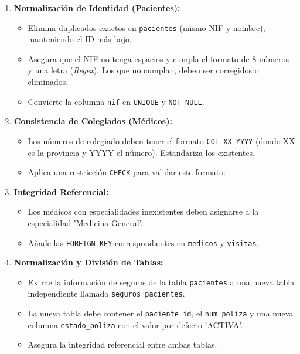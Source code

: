 \documentclass[12pt,a4paper]{article}
\begin{document}
\begin{enumerate}
    \item \textbf{Normalización de Identidad (Pacientes):}
    \begin{itemize}
        \item Elimina duplicados exactos en \texttt{pacientes} (mismo NIF y nombre), manteniendo el ID más bajo.
        \item Asegura que el NIF no tenga espacios y cumpla el formato de 8 números y una letra (\textit{Regex}). Los que no cumplan, deben ser corregidos o eliminados.
        \item Convierte la columna \texttt{nif} en \texttt{UNIQUE} y \texttt{NOT NULL}.
    \end{itemize}
    
    \item \textbf{Consistencia de Colegiados (Médicos):}
    \begin{itemize}
        \item Los números de colegiado deben tener el formato \texttt{COL-XX-YYYY} (donde XX es la provincia y YYYY el número). Estandariza los existentes.
        \item Aplica una restricción \texttt{CHECK} para validar este formato.
    \end{itemize}
    
    \item \textbf{Integridad Referencial:}
    \begin{itemize}
        \item Los médicos con especialidades inexistentes deben asignarse a la especialidad 'Medicina General'.
        \item Añade las \texttt{FOREIGN KEY} correspondientes en \texttt{medicos} y \texttt{visitas}.
    \end{itemize}

    \item \textbf{Normalización y División de Tablas:}
    \begin{itemize}
        \item Extrae la información de seguros de la tabla \texttt{pacientes} a una nueva tabla independiente llamada \texttt{seguros\_pacientes}. 
        \item La nueva tabla debe contener el \texttt{paciente\_id}, el \texttt{num\_poliza} y una nueva columna \texttt{estado\_poliza} con el valor por defecto 'ACTIVA'.
        \item Asegura la integridad referencial entre ambas tablas.
    \end{itemize}


\end{enumerate}
\end{document}

